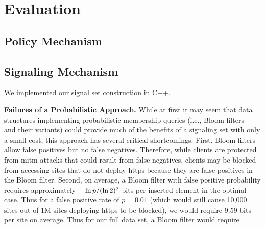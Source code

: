 \section{Evaluation}
\label{sec:evaluation}

\subsection{Policy Mechanism}


\subsection{Signaling Mechanism}

We implemented our signal set construction in C++.



\textbf{Failures of a Probabilistic Approach.} While at first it may seem that
data structures implementing probabilistic membership queries (i.e., Bloom
filters~\cite{bloom1970space} and their variants) could provide much of the
benefits of a signaling set with only a small cost, this approach has several
critical shortcomings. First, Bloom filters allow false positives but no false
negatives. Therefore, while clients are protected from \ac{mitm} attacks that
could result from false negatives, clients may be blocked from accessing sites
that do not deploy \ac{https} because they are false positives in the Bloom
filter. Second, on average, a Bloom filter with false positive probability
\bloomfpp requires approximately $-\ln p/(\ln 2)^2$ bits per inserted
element in the optimal case. Thus for a false positive rate of $p = 0.01$ (which
would still cause 10,000 sites out of 1M sites deploying \ac{https} to be
blocked), we would require 9.59 bits per site on average. Thus for our full data
set, a Bloom filter would require .
